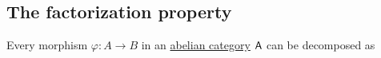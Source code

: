 \documentclass[../../../main]{subfiles}
\begin{document}
\subsection*{The factorization property}

\begin{theorem} \label{thm:factorization-property}
  Every morphism \(\varphi: A \to B\) in an \hyperref[def:abelian-category]{abelian category} \(\mathsf{A}\) can be decomposed as
  \begin{center}
  \end{center}
\end{theorem}
\end{document}
